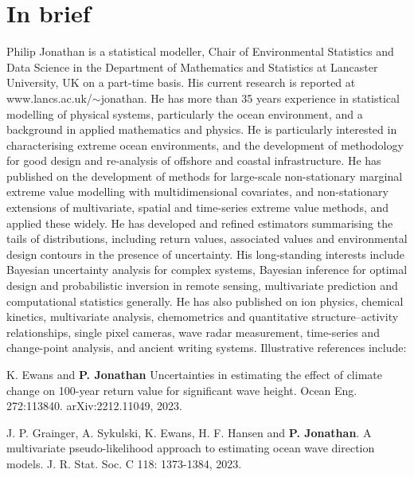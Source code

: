 \documentclass[11pt,a4paper]{moderncv}
\begin{document}
\makecvtitle

\vspace{-30pt}

\section{In brief}

\setlength{\parskip}{0.5em}

Philip Jonathan is a statistical modeller, Chair of Environmental Statistics and Data Science in the Department of Mathematics and Statistics at Lancaster University, UK on a part-time basis. His current research is reported at www.lancs.ac.uk/$\sim$jonathan. He has more than 35 years experience in statistical modelling of physical systems, particularly the ocean environment, and a background in applied mathematics and physics. He is particularly interested in characterising extreme ocean environments, and the development of methodology for good design and re-analysis of offshore and coastal infrastructure. He has published on the development of methods for large-scale non-stationary marginal extreme value modelling with multidimensional covariates, and non-stationary extensions of multivariate, spatial and time-series extreme value methods, and applied these widely. He has developed and refined estimators summarising the tails of distributions, including return values, associated values and environmental design contours in the presence of uncertainty. His long-standing interests include Bayesian uncertainty analysis for complex systems, Bayesian inference for optimal design and probabilistic inversion in remote sensing, multivariate prediction and computational statistics generally. He has also published on ion physics, chemical kinetics, multivariate analysis, chemometrics and quantitative structure--activity relationships, single pixel cameras, wave radar measurement, time-series and change-point analysis, and ancient writing systems. Illustrative references include:

\setlength{\parskip}{0.2em}

K. Ewans and \textbf{P. Jonathan} Uncertainties in estimating the effect of climate change on 100-year return value for significant wave height. Ocean Eng. 272:113840. arXiv:2212.11049, 2023.

J. P. Grainger, A. Sykulski, K. Ewans, H. F. Hansen and \textbf{P. Jonathan}. A multivariate pseudo-likelihood approach to estimating ocean wave direction models. J. R. Stat. Soc. C 118: 1373-1384, 2023.
\end{document}
